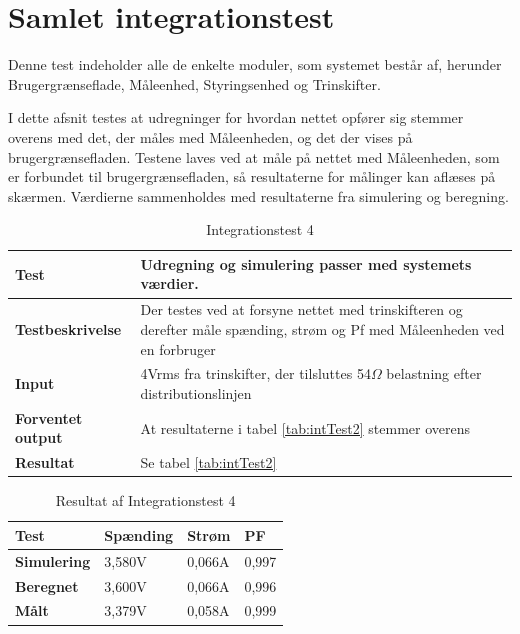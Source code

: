 
\section{Samlet integrationstest}
Denne test indeholder alle de enkelte moduler, som systemet består af, herunder Brugergrænseflade, Måleenhed, Styringsenhed og Trinskifter. 

I dette afsnit testes at udregninger for hvordan nettet opfører sig stemmer overens med det, der måles med Måleenheden, og det der vises på brugergrænsefladen.
Testene laves ved at måle på nettet med Måleenheden, som er forbundet til brugergrænsefladen, så resultaterne for målinger kan aflæses på skærmen. Værdierne sammenholdes med resultaterne fra simulering og beregning. 



\begin{table}[H]
	\begin{tabular}{ | m{} | m{}|} 
		\hline
		\textbf{Test}					&Udregning og simulering passer med systemets værdier. \\ \hline
		\textbf{Testbeskrivelse}		&Der testes ved at forsyne nettet med trinskifteren og derefter måle spænding, strøm og Pf med Måleenheden ved en forbruger \\ \hline
		\textbf{Input}					&4Vrms fra trinskifter, der tilsluttes 54$\Omega$ belastning efter distributionslinjen \\ \hline
		\textbf{Forventet output}		&At resultaterne i tabel \ref{tab:intTest2} stemmer overens \\ \hline
		\textbf{Resultat}				&Se tabel \ref{tab:intTest2} \\ \hline
	\end{tabular}
	\caption{Integrationstest 4}
\label{tab:intTest4}
\end{table}


\begin{table}[H]
	\begin{tabular}{ | m{} | m{} | m{} | m{}|}  
		\hline
		\textbf{Test}			& \textbf{Spænding} & \textbf{Strøm}  	& \textbf{PF}			\\ \hline
		\textbf{Simulering}		&3,580V					&0,066A				  	&0,997 					\\ \hline
		\textbf{Beregnet}		&3,600V 					&0,066A					&0,996					\\ \hline
		\textbf{Målt}			&3,379V					&0,058A					&0,999				\\ \hline
	\end{tabular}
	\caption{Resultat af Integrationstest 4}
	\label{tab:intTest4result}
\end{table}

